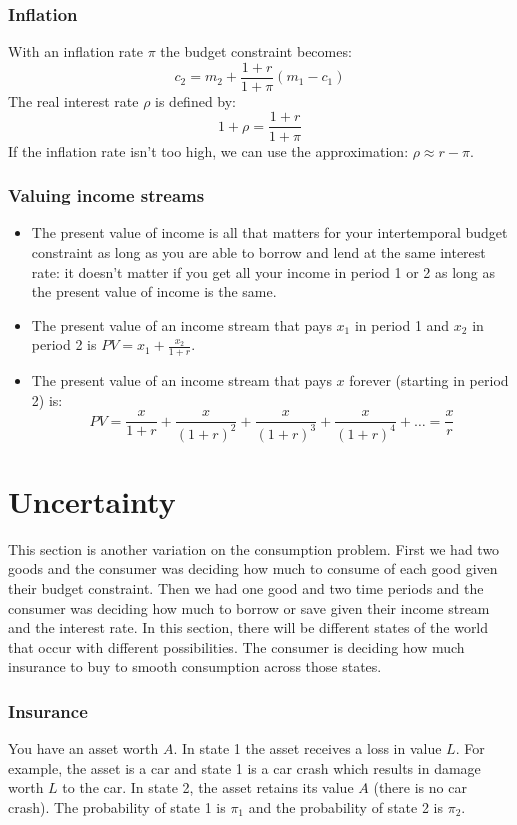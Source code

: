 \documentclass{article}
\begin{document}
\subsubsection*{Inflation}
With an inflation rate $\pi$ the budget constraint becomes:
\[
  c_2 = m_2 + \frac{1+r}{1+\pi}\left( m_1-c_1 \right)
\]
The real interest rate $\rho$ is defined by:
\[
  1+\rho = \frac{1+r}{1+\pi}
\]
If the inflation rate isn't too high, we can use the approximation:
$\rho\approx r-\pi$.
\subsubsection*{Valuing income streams}
\begin{itemize}
  \item  The present value of income is all that matters for your intertemporal budget constraint as long as you are able to borrow and lend at the same interest rate: it doesn't matter if you get all your income in period 1 or 2 as long as the present value of income is the same.
  \item The present value of an income stream that pays $x_1$ in period 1 and $x_2$ in period 2 is $PV=x_1 + \frac{x_2}{1+r}$.
  \item The present value of an income stream that pays $x$ forever (starting in period 2) is:
    \[ PV=\frac{x}{1+r}+\frac{x}{\left( 1+r \right)^2}+\frac{x}{\left( 1+r \right)^3} +\frac{x}{\left( 1+r \right)^4}+\dots=\frac{x}{r} \]
\end{itemize}

\section{Uncertainty}
This section is another variation on the consumption problem. First we had two goods and the consumer was deciding how much to consume of each good given their budget constraint. Then we had one good and two time periods and the consumer was deciding how much to borrow or save given their income stream and the interest rate. In this section, there will be different states of the world that occur with different possibilities. The consumer is deciding how much insurance to buy to smooth consumption across those states.

\subsubsection*{Insurance}
You have an asset worth $A$. In state 1 the asset receives a loss in value $L$. For example, the asset is a car and state 1 is a car crash which results in damage worth $L$ to the car. In state 2, the asset retains its value $A$ (there is no car crash). The probability of state 1 is $\pi_1$ and the probability of state 2 is $\pi_2$.
\end{document}
